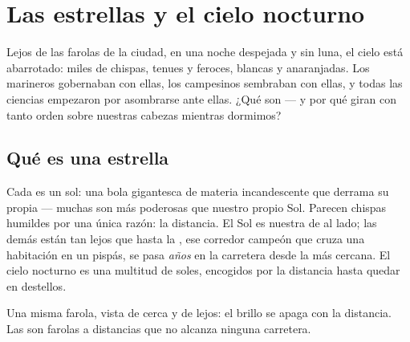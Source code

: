 \chapter{Las estrellas y el cielo nocturno}\label{ch:g5:stars-night-sky}

Lejos de las farolas de la ciudad, en una noche despejada y sin luna,
el cielo está abarrotado: miles de chispas, tenues y feroces, blancas y
anaranjadas. Los marineros gobernaban con ellas, los campesinos
sembraban con ellas, y todas las ciencias empezaron por asombrarse ante
ellas. ¿Qué son --- y por qué giran con tanto orden sobre nuestras
cabezas mientras dormimos?

\section{Qué es una estrella}

\begin{example}\label{ex:g5:stars-night-sky:suns}
Cada  es un sol: una bola gigantesca de materia
incandescente que derrama su propia  --- muchas son más
poderosas que nuestro propio Sol. Parecen chispas humildes por una
única razón: la distancia. El Sol es nuestra  de al lado;
las demás están tan lejos que hasta la , ese corredor campeón
que cruza una habitación en un pispás, se pasa \emph{años} en la
carretera desde la más cercana. El cielo nocturno es una multitud de
soles, encogidos por la distancia hasta quedar en destellos.
\end{example}

\begin{omfigure}

{\small Una misma farola, vista de cerca y de lejos: el brillo se
apaga con la distancia. Las  son farolas a distancias que
no alcanza ninguna carretera.}
\end{omfigure}

